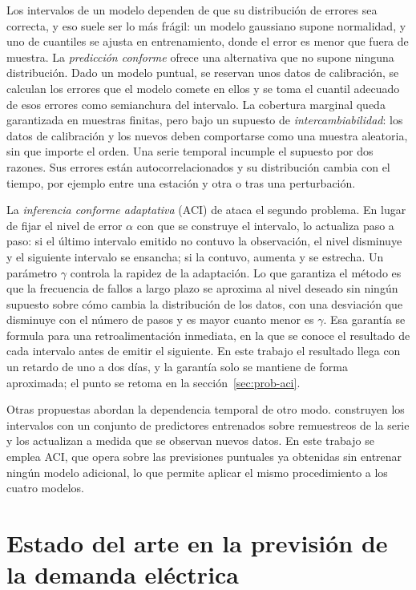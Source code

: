 Los intervalos de un modelo dependen de que su distribución de errores sea
correcta, y eso suele ser lo más frágil: un modelo gaussiano supone
normalidad, y uno de cuantiles se ajusta en entrenamiento, donde el error es
menor que fuera de muestra. La \emph{predicción conforme} ofrece una
alternativa que no supone ninguna distribución. Dado un modelo puntual, se
reservan unos datos de calibración, se calculan los errores que el modelo
comete en ellos y se toma el cuantil adecuado de esos errores como semianchura
del intervalo. La cobertura marginal queda garantizada en muestras finitas,
pero bajo un supuesto de \emph{intercambiabilidad}: los datos de calibración y
los nuevos deben comportarse como una muestra aleatoria, sin que importe el
orden. Una serie temporal incumple el supuesto por dos razones. Sus errores
están autocorrelacionados y su distribución cambia con el tiempo, por ejemplo
entre una estación y otra o tras una perturbación.

La \emph{inferencia conforme adaptativa} (ACI) de \textcite{gibbs2021adaptive}
ataca el segundo problema. En lugar de fijar el nivel de error $\alpha$ con
que se construye el intervalo, lo actualiza paso a paso: si el último
intervalo emitido no contuvo la observación, el nivel disminuye y el siguiente
intervalo se ensancha; si la contuvo, aumenta y se estrecha. Un parámetro
$\gamma$ controla la rapidez de la adaptación. Lo que garantiza el método es
que la frecuencia de fallos a largo plazo se aproxima al nivel deseado sin
ningún supuesto sobre cómo cambia la distribución de los datos, con una
desviación que disminuye con el número de pasos y es mayor cuanto menor es
$\gamma$. Esa garantía se formula para una retroalimentación inmediata, en la que se
conoce el resultado de cada intervalo antes de emitir el siguiente. En
este trabajo el resultado llega con un retardo de uno a dos días, y la
garantía solo se mantiene de forma aproximada; el punto se retoma en la
sección~\ref{sec:prob-aci}.

Otras propuestas abordan la dependencia temporal de otro modo.
\textcite{xu2021conformal} construyen los intervalos con un conjunto de
predictores entrenados sobre remuestreos de la serie y los actualizan a
medida que se observan nuevos datos. En este trabajo se emplea ACI, que opera sobre las
previsiones puntuales ya obtenidas sin entrenar ningún modelo adicional, lo
que permite aplicar el mismo procedimiento a los cuatro modelos.


\section{Estado del arte en la previsión de la demanda eléctrica}\label{sec:estado-arte}

